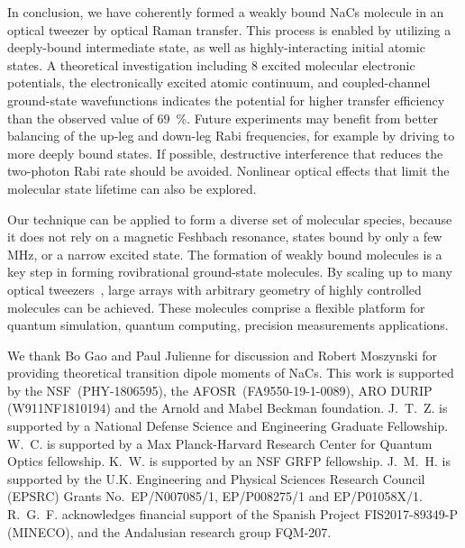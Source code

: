 \documentclass[aps,prx,twocolumn,10pt,superscriptaddress]{revtex4-2}
\begin{document}
In conclusion, we have coherently formed a weakly bound NaCs molecule in an optical tweezer
by optical Raman transfer.  This process is enabled by utilizing a deeply-bound intermediate state, as well as highly-interacting initial atomic states.  A theoretical investigation including 8 excited molecular electronic potentials,
the electronically excited atomic continuum, and coupled-channel ground-state wavefunctions indicates
the potential for higher transfer efficiency than the observed value of $69$~\%.  Future experiments may benefit from better balancing of the up-leg and down-leg Rabi frequencies, for example by driving to more deeply bound states.  If possible, destructive interference that reduces the two-photon Rabi rate should be avoided.  Nonlinear optical effects that limit the molecular state lifetime can also be explored.

Our technique can be applied to form a diverse set of molecular species,
because it does not rely on a magnetic Feshbach resonance, states bound by only a few MHz,
or a narrow excited state. The formation of weakly bound molecules is a key step
in forming rovibrational ground-state molecules. By scaling up to many optical tweezers~\cite{Endres2016, Barredo2018,  PhysRevLett.122.203601}, large arrays with arbitrary geometry of highly controlled molecules can be achieved. These molecules comprise a flexible platform for quantum simulation,  quantum computing, precision measurements applications.

\begin{acknowledgments}
  We thank Bo Gao and Paul Julienne for discussion and Robert Moszynski for providing theoretical transition dipole moments of NaCs. This work is supported by the NSF~(PHY-1806595), the AFOSR~(FA9550-19-1-0089), ARO DURIP (W911NF1810194) and the Arnold and Mabel Beckman foundation. J.~T.~Z. is supported by a National Defense Science and Engineering Graduate Fellowship. W.~C. is supported by a Max Planck-Harvard Research Center for Quantum Optics fellowship. K.~W. is supported by an NSF GRFP fellowship. J.~M.~H. is supported by the U.K. Engineering and Physical Sciences Research Council (EPSRC) Grants No.\ EP/N007085/1, EP/P008275/1 and EP/P01058X/1. R.~G.~F. acknowledges financial support of the Spanish Project FIS2017-89349-P (MINECO), and the Andalusian research group FQM-207.
\end{acknowledgments}


% 
\end{document}
